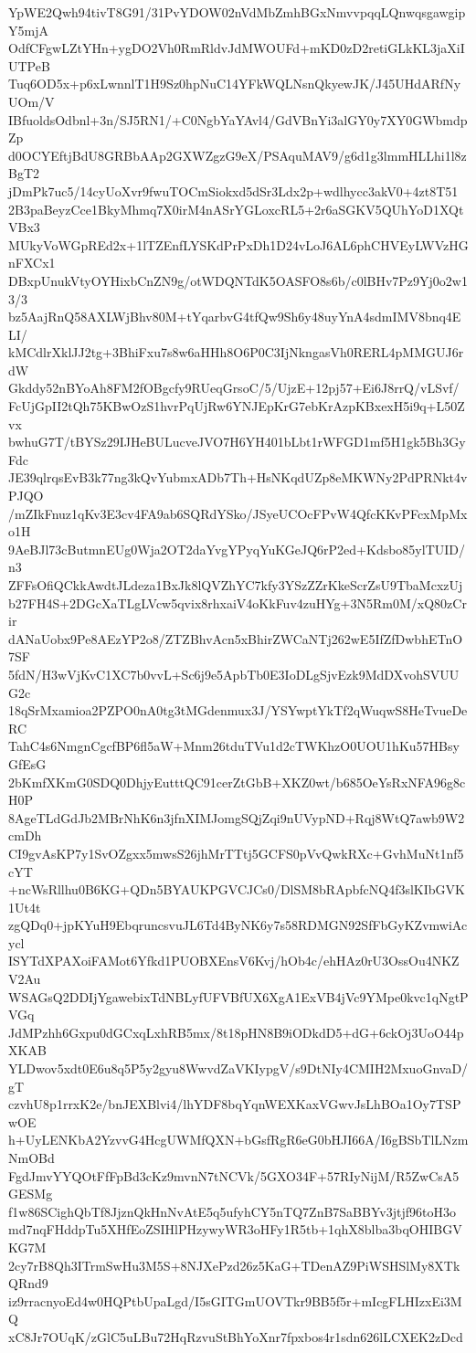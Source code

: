 YpWE2Qwh94tivT8G91/31PvYDOW02nVdMbZmhBGxNmvvpqqLQnwqsgawgipY5mjA
OdfCFgwLZtYHn+ygDO2Vh0RmRldvJdMWOUFd+mKD0zD2retiGLkKL3jaXiIUTPeB
Tuq6OD5x+p6xLwnnlT1H9Sz0hpNuC14YFkWQLNsnQkyewJK/J45UHdARfNyUOm/V
IBfuoldsOdbnl+3n/SJ5RN1/+C0NgbYaYAvl4/GdVBnYi3alGY0y7XY0GWbmdpZp
d0OCYEftjBdU8GRBbAAp2GXWZgzG9eX/PSAquMAV9/g6d1g3lmmHLLhi1l8zBgT2
jDmPk7uc5/14cyUoXvr9fwuTOCmSiokxd5dSr3Ldx2p+wdlhycc3akV0+4zt8T51
2B3paBeyzCce1BkyMhmq7X0irM4nASrYGLoxcRL5+2r6aSGKV5QUhYoD1XQtVBx3
MUkyVoWGpREd2x+1lTZEnfLYSKdPrPxDh1D24vLoJ6AL6phCHVEyLWVzHGnFXCx1
DBxpUnukVtyOYHixbCnZN9g/otWDQNTdK5OASFO8s6b/c0lBHv7Pz9Yj0o2w13/3
bz5AajRnQ58AXLWjBhv80M+tYqarbvG4tfQw9Sh6y48uyYnA4sdmIMV8bnq4ELI/
kMCdlrXklJJ2tg+3BhiFxu7s8w6aHHh8O6P0C3IjNkngasVh0RERL4pMMGUJ6rdW
Gkddy52nBYoAh8FM2fOBgcfy9RUeqGrsoC/5/UjzE+12pj57+Ei6J8rrQ/vLSvf/
FcUjGpII2tQh75KBwOzS1hvrPqUjRw6YNJEpKrG7ebKrAzpKBxexH5i9q+L50Zvx
bwhuG7T/tBYSz29IJHeBULucveJVO7H6YH401bLbt1rWFGD1mf5H1gk5Bh3GyFdc
JE39qlrqsEvB3k77ng3kQvYubmxADb7Th+HsNKqdUZp8eMKWNy2PdPRNkt4vPJQO
/mZIkFnuz1qKv3E3cv4FA9ab6SQRdYSko/JSyeUCOcFPvW4QfcKKvPFcxMpMxo1H
9AeBJl73cButmnEUg0Wja2OT2daYvgYPyqYuKGeJQ6rP2ed+Kdsbo85ylTUID/n3
ZFFsOfiQCkkAwdtJLdeza1BxJk8lQVZhYC7kfy3YSzZZrKkeScrZsU9TbaMcxzUj
b27FH4S+2DGcXaTLgLVcw5qvix8rhxaiV4oKkFuv4zuHYg+3N5Rm0M/xQ80zCrir
dANaUobx9Pe8AEzYP2o8/ZTZBhvAcn5xBhirZWCaNTj262wE5IfZfDwbhETnO7SF
5fdN/H3wVjKvC1XC7b0vvL+Sc6j9e5ApbTb0E3IoDLgSjvEzk9MdDXvohSVUUG2c
18qSrMxamioa2PZPO0nA0tg3tMGdenmux3J/YSYwptYkTf2qWuqwS8HeTvueDeRC
TahC4s6NmgnCgcfBP6fl5aW+Mnm26tduTVu1d2cTWKhzO0UOU1hKu57HBsyGfEsG
2bKmfXKmG0SDQ0DhjyEutttQC91cerZtGbB+XKZ0wt/b685OeYsRxNFA96g8cH0P
8AgeTLdGdJb2MBrNhK6n3jfnXIMJomgSQjZqi9nUVypND+Rqj8WtQ7awb9W2cmDh
CI9gvAsKP7y1SvOZgxx5mwsS26jhMrTTtj5GCFS0pVvQwkRXc+GvhMuNt1nf5cYT
+ncWsRllhu0B6KG+QDn5BYAUKPGVCJCs0/DlSM8bRApbfcNQ4f3slKIbGVK1Ut4t
zgQDq0+jpKYuH9EbqruncsvuJL6Td4ByNK6y7s58RDMGN92SfFbGyKZvmwiAcycl
ISYTdXPAXoiFAMot6Yfkd1PUOBXEnsV6Kvj/hOb4c/ehHAz0rU3OssOu4NKZV2Au
WSAGsQ2DDIjYgawebixTdNBLyfUFVBfUX6XgA1ExVB4jVc9YMpe0kvc1qNgtPVGq
JdMPzhh6Gxpu0dGCxqLxhRB5mx/8t18pHN8B9iODkdD5+dG+6ckOj3UoO44pXKAB
YLDwov5xdt0E6u8q5P5y2gyu8WwvdZaVKIypgV/s9DtNIy4CMIH2MxuoGnvaD/gT
czvhU8p1rrxK2e/bnJEXBlvi4/lhYDF8bqYqnWEXKaxVGwvJsLhBOa1Oy7TSPwOE
h+UyLENKbA2YzvvG4HcgUWMfQXN+bGsfRgR6eG0bHJI66A/I6gBSbTlLNzmNmOBd
FgdJmvYYQOtFfFpBd3cKz9mvnN7tNCVk/5GXO34F+57RIyNijM/R5ZwCsA5GESMg
f1w86SCighQbTf8JjznQkHnNvAtE5q5ufyhCY5nTQ7ZnB7SaBBYv3jtjf96toH3o
md7nqFHddpTu5XHfEoZSIHlPHzywyWR3oHFy1R5tb+1qhX8blba3bqOHIBGVKG7M
2cy7rB8Qh3ITrmSwHu3M5S+8NJXePzd26z5KaG+TDenAZ9PiWSHSlMy8XTkQRnd9
iz9rracnyoEd4w0HQPtbUpaLgd/I5sGITGmUOVTkr9BB5f5r+mIcgFLHIzxEi3MQ
xC8Jr7OUqK/zGlC5uLBu72HqRzvuStBhYoXnr7fpxbos4r1sdn626lLCXEK2zDcd
